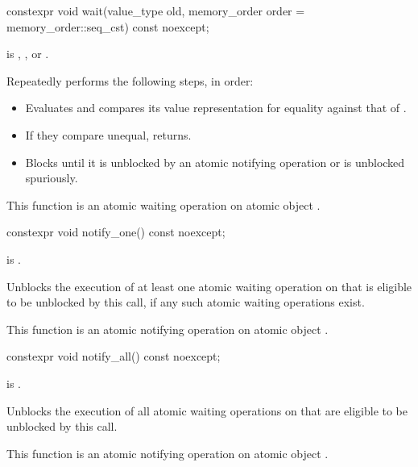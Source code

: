 %
\begin{itemdecl}
constexpr void wait(value_type old, memory_order order = memory_order::seq_cst) const noexcept;
\end{itemdecl}

\begin{itemdescr}
\pnum
\expects
{} is
,
, or
.

\pnum
\effects
Repeatedly performs the following steps, in order:
\begin{itemize}
\item
  Evaluates  and
  compares its value representation for equality against that of .
\item
  If they compare unequal, returns.
\item
  Blocks until it
  is unblocked by an atomic notifying operation or is unblocked spuriously.
\end{itemize}

\pnum
\remarks
This function is an atomic waiting operation
on atomic object .
\end{itemdescr}

%
\begin{itemdecl}
constexpr void notify_one() const noexcept;
\end{itemdecl}

\begin{itemdescr}
\pnum
\constraints
{} is .

\pnum
\effects
Unblocks the execution of at least one atomic waiting operation on 
that is eligible to be unblocked by this call,
if any such atomic waiting operations exist.

\pnum
\remarks
This function is an atomic notifying operation
on atomic object .
\end{itemdescr}

%
\begin{itemdecl}
constexpr void notify_all() const noexcept;
\end{itemdecl}

\begin{itemdescr}
\pnum
\constraints
{} is .

\pnum
\effects
Unblocks the execution of all atomic waiting operations on 
that are eligible to be unblocked by this call.

\pnum
\remarks
This function is an atomic notifying operation
on atomic object .
\end{itemdescr}

